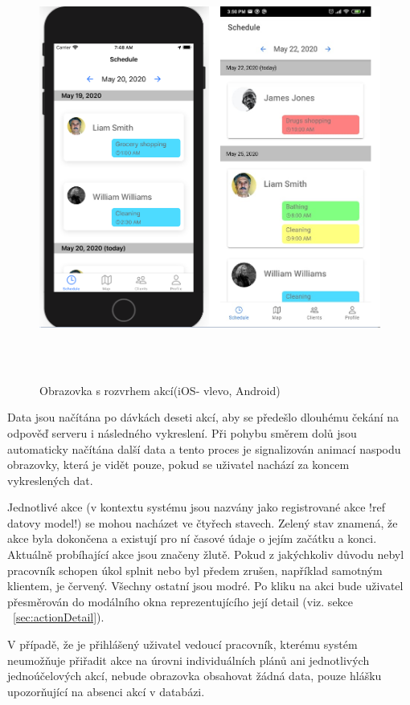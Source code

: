 \documentclass[
  biblatex,
  glossaries,
  index
]{kidiplom}
\begin{document}
\begin{figure}[H]
  	\centering
 	 \includegraphics[width=14cm,height=14cm,keepaspectratio]{schedule_screen}
 	 \caption{Obrazovka s rozvrhem akcí(iOS- vlevo, Android)}
 	 \label{fig:schedule_screen}
\end{figure}

Data jsou načítána po dávkách deseti akcí, aby se předešlo dlouhému čekání na odpověď serveru i následného vykreslení. Při pohybu směrem dolů jsou automaticky načítána další data a tento proces je signalizován animací naspodu obrazovky, která je vidět pouze, pokud se uživatel nachází za koncem vykreslených dat.

Jednotlivé akce (v kontextu systému jsou nazvány jako registrované akce !ref datovy model!) se mohou nacházet ve čtyřech stavech. Zelený stav znamená, že akce byla dokončena a existují pro ní časové údaje o jejím začátku a konci. Aktuálně probíhající akce jsou značeny žlutě. Pokud z jakýchkoliv důvodu nebyl pracovník schopen úkol splnit nebo byl předem zrušen, například samotným klientem, je červený. Všechny ostatní jsou modré. Po kliku na akci bude uživatel přesměrován do modálního okna reprezentujícího její detail (viz. sekce ~\ref{sec:actionDetail}).

V případě, že je přihlášený uživatel vedoucí pracovník, kterému systém neumožňuje přiřadit akce na úrovni individuálních plánů ani jednotlivých jednoúčelových akcí, nebude obrazovka obsahovat žádná data, pouze hlášku upozorňující na absenci akcí v databázi.
\end{document}
